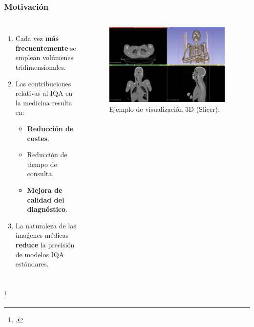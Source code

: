 
\begin{frame}
  \frametitle{Motivación}
  \begin{columns}
    \begin{enumerate}
    \item Cada vez \textbf{más frecuentemente} se emplean volúmenes tridimensionales.
    \item Las contribuciones relativas al IQA en la medicina resulta en: 
      \begin{itemize}
        \item \textbf{Reducción de costes}. 
        \item Reducción de tiempo de consulta.
        \item \textbf{Mejora de calidad del diagnóstico}.
      \end{itemize}
    \item La naturaleza de las imaǵenes médicas \textbf{reduce} la precisión de modelos IQA estándares.
    \end{enumerate}
  \begin{figure}
    \begin{center}
      \includegraphics[width=0.95\textwidth]{imagenes/chapter1/SlicerVisualization}
    \end{center}
    \caption{Ejemplo de visualización 3D (Slicer\footnotemark).}
  \end{figure}
  \end{columns}
  \footcitetext{Slicer3D}
\end{frame}

